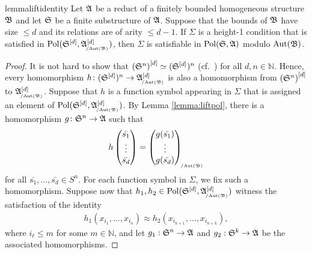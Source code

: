  

\begin{restatable}{lemma}{liftidentity} \label{lemma:liftidentity} 
    Let $\mathfrak{A}$ be a reduct of a finitely bounded homogeneous structure $\mathfrak{B}$ and let $\mathfrak{S}$ be a finite substructure of $\mathfrak{A}$. 
    Suppose that the bounds of $\mathfrak{B}$ have size $\leq d$ and its relations
are of arity $\leq d-1$.
    If $\Sigma$ is a height-1 condition that is satisfied in $\Pol(\fpwr{\struct{S}}{d},\fpwr{\struct{A}}{d}_{\orbeq{\Aut(\struct{B})}})$, then $\Sigma$ is satisfiable in $\mathrm{Pol}(\mathfrak{S},\mathfrak{A})$ modulo $\mathrm{Aut}(\mathfrak{B})$.
 \end{restatable} 
 
    \begin{proof}  
    It is not hard to show that ${(\mathfrak{S}^n)}^{[d]} \simeq ({\mathfrak{S}}^{[d]})^n$ (cf.~\cite[Corollary 22]{Mottet_2025}) for all $d,n\in \mathbb{N}$.
        Hence, every homomorphism $h\colon (\fpwr{\struct{S}}{d})^{n}\to \fpwr{\struct{A}}{d}_{\orbeq{\Aut(\struct{B})}}$ is also a homomorphism from ${(\mathfrak{S}^{n})}^{[d]}$ to $\fpwr{\struct{A}}{d}_{\orbeq{\Aut(\struct{B})}}$.
        Suppose that $h$ is a function symbol appearing in $\Sigma$ that is assigned an element of $\Pol(\fpwr{\struct{S}}{d},\fpwr{\struct{A}}{d}_{\orbeq{\Aut(\struct{B})}})$. 
        By Lemma \ref{lemma:liftpol}, there is a homomorphism $g\colon \mathfrak{S}^{n}\to \mathfrak{A}$ such that 
        \begin{align*}
            h\begin{pmatrix}\bar{s_1} \\\vdots\\\bar{s_d}\end{pmatrix}=\begin{pmatrix}g(\bar{s_1})\\\vdots\\g(\bar{s_d}) \end{pmatrix}_{\orbeq{\Aut(\struct{B})}}   
        \end{align*}
        for all $\bar{s_1},\dots,\bar{s_d} \in S^{n}$.
        For each function symbol in $\Sigma$, we fix such a homomorphism. 
        Suppose now that $h_1,h_2\in  \Pol(\fpwr{\struct{S}}{d},\fpwr{\struct{A}}{d}_{\orbeq{\Aut(\struct{B})}})$ witness the satisfaction of the identity 
        \begin{align*}
            h_1(x_{i_1},\dots,x_{i_{n}})\approx h_2(x_{i_{n+1}},\dots,x_{i_{n+k}}),
        \end{align*}
        where $i_\ell\leq m$ for some $m\in\mathbb{N}$, and let $g_1:\mathfrak{S}^{n}\to \mathfrak{A}$ and $g_2:\mathfrak{S}^{k}\to \mathfrak{A}$ be the associated homomorphisms.
        

\end{proof}
